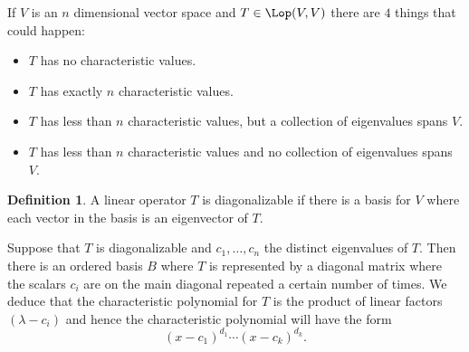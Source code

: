 \documentclass[12pt]{article}
\theoremstyle{plain}
\theoremstyle{definition}
\newtheorem{def}{Definition}
\begin{document}
If $V$ is an $n$ dimensional vector space and $T \in \Lop(V, V)$ there are $4$ things that could happen:
\begin{itemize}
	\item $T$ has no characteristic values.
	\item $T$ has exactly $n$ characteristic values. 
	\item $T$ has less than $n$ characteristic values, but a collection of eigenvalues spans $V$.
	\item $T$ has less than $n$ characteristic values and no collection of eigenvalues spans $V$.
\end{itemize}

\begin{def}
A linear operator $T$ is diagonalizable if there is a basis for $V$ where each vector in the basis is an eigenvector of $T$.
\end{def}

Suppose that $T$ is diagonalizable and $c_1, \dotsc, c_n$ the distinct eigenvalues of $T$. Then there is an ordered basis $B$ where $T$ is represented by a diagonal matrix where the scalars $c_i$ are on the main diagonal repeated a certain number of times.
We deduce that the characteristic polynomial for $T$ is the product of linear factors $(\lambda - c_i)$ and hence the characteristic polynomial will have the form 
\[ (x - c_1)^{d_1}\cdots(x - c_k)^{d_k}.\]
\end{document}

